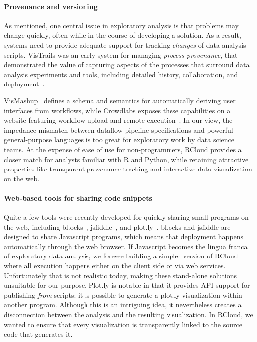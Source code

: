\paragraph*{Provenance and versioning} As
mentioned, one central issue in exploratory analysis is that
problems may change quickly, often while in the course of
developing a solution. As a result, systems need to provide adequate
support for tracking \emph{changes} of data analysis scripts. VisTrails
was an early system for managing \emph{process provenance},
that demonstrated the value of capturing aspects of the processes
that surround data analysis experiments and tools, including detailed
history, collaboration, and deployment~\cite{Callahan:2006:VVM}.

VisMashup~\cite{Santos:2009:VST} defines a schema and
semantics for automatically deriving user interfaces from workflows,
while Crowdlabs exposes these capabilities on a website
featuring workflow upload and remote execution~\cite{Mates:2011:CSA}.
In our view, the impedance mismatch between dataflow pipeline
specifications and powerful general-purpose languages is too great
for exploratory work by data science teams. At the
expense of ease of use for non-programmers, RCloud provides
a closer match for analysts familiar with R and Python,
while retaining attractive properties like transparent
provenance tracking and interactive data visualization on the web.

\paragraph*{Web-based tools for sharing code snippets}
Quite a few tools were recently developed for quickly
sharing small programs on the web, including
bl.ocks~\cite{blocks}, jsfiddle~\cite{jsfiddle}, and
plot.ly~\cite{plotly}. bl.ocks and jsfiddle are designed to
share Javascript programs, which means that deployment happens
automatically through the web browser. If Javascript becomes
the lingua franca of exploratory data analysis, we foresee
building a simpler version of RCloud where all execution happens
either on the client side or via web services. Unfortunately that is
not realistic today, making these stand-alone
solutions unsuitable for our purpose. Plot.ly is notable in that it
provides API support for publishing \emph{from} scripts: 
it is possible to generate a plot.ly visualization within
another program. Although this is an intriguing idea, it
nevertheless creates a disconnection between the analysis and the
resulting visualization. In RCloud, we wanted to ensure that every
visualization is transparently linked to the source code that
generates it.


